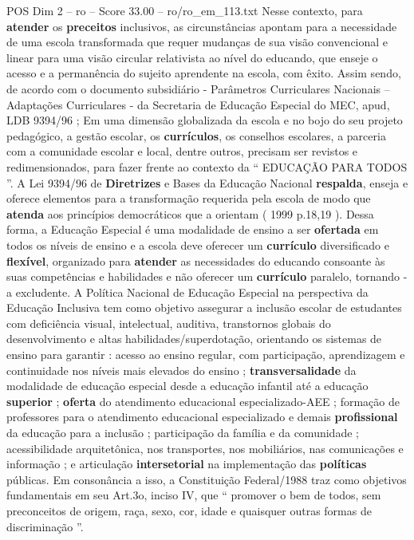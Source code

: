 \begin{textsample}{POS Dim 2 – ro – Score 33.00 – ro/ro\_em\_113.txt}
Nesse contexto, para \textbf{atender} os \textbf{preceitos} inclusivos, as circunstâncias apontam para a necessidade de uma escola transformada que requer mudanças de sua visão convencional e linear para uma visão circular relativista ao nível do educando, que enseje o acesso e a permanência do sujeito aprendente na escola, com êxito.
Assim sendo, de acordo com o documento subsidiário - Parâmetros Curriculares Nacionais – Adaptações Curriculares - da Secretaria de Educação Especial do MEC, apud, LDB 9394/96 ; Em uma dimensão globalizada da escola e no bojo do seu projeto pedagógico, a gestão escolar, os \textbf{currículos}, os conselhos escolares, a parceria com a comunidade escolar e local, dentre outros, precisam ser revistos e redimensionados, para fazer frente ao contexto da “ EDUCAÇÃO PARA TODOS ”.
A Lei 9394/96 de \textbf{Diretrizes} e Bases da Educação Nacional \textbf{respalda}, enseja e oferece elementos para a transformação requerida pela escola de modo que \textbf{atenda} aos princípios democráticos que a orientam ( 1999 p.18,19 ).
Dessa forma, a Educação Especial é uma modalidade de ensino a ser \textbf{ofertada} em todos os níveis de ensino e a escola deve oferecer um \textbf{currículo} diversificado e \textbf{flexível}, organizado para \textbf{atender} as necessidades do educando consoante às suas competências e habilidades e não oferecer um \textbf{currículo} paralelo, tornando -a excludente.
A Política Nacional de Educação Especial na perspectiva da Educação Inclusiva tem como objetivo assegurar a inclusão escolar de estudantes com deficiência visual, intelectual, auditiva, transtornos globais do desenvolvimento e altas habilidades/superdotação, orientando os sistemas de ensino para garantir : acesso ao ensino regular, com participação, aprendizagem e continuidade nos níveis mais elevados do ensino ; \textbf{transversalidade} da modalidade de educação especial desde a educação infantil até a educação \textbf{superior} ; \textbf{oferta} do atendimento educacional especializado-AEE ; formação de professores para o atendimento educacional especializado e demais \textbf{profissional} da educação para a inclusão ; participação da família e da comunidade ; acessibilidade arquitetônica, nos transportes, nos mobiliários, nas comunicações e informação ; e articulação \textbf{intersetorial} na implementação das \textbf{políticas} públicas.
Em consonância a isso, a Constituição Federal/1988 traz como objetivos fundamentais em seu Art.3o, inciso IV, que “ promover o bem de todos, sem preconceitos de origem, raça, sexo, cor, idade e quaisquer outras formas de discriminação ”.

\end{textsample}
